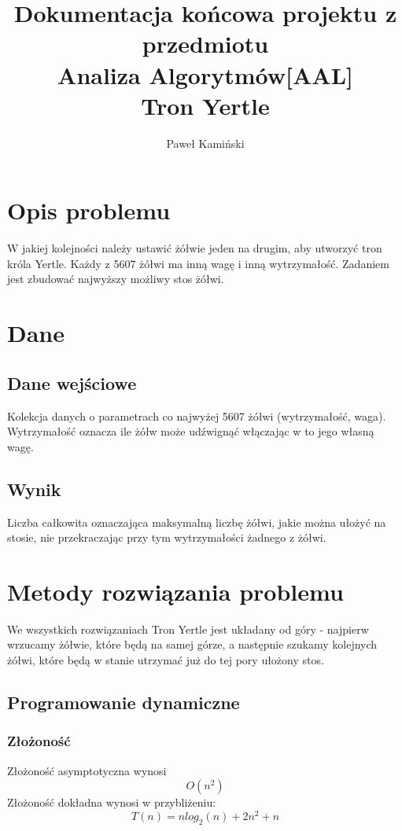 \documentclass[11pt,a4paper]{article}
\title{Dokumentacja końcowa projektu z przedmiotu\\Analiza Algorytmów[AAL]\\Tron Yertle}
\author{Paweł Kamiński}
\begin{document}
\maketitle
\section{Opis problemu}

W jakiej kolejności należy ustawić żółwie jeden na drugim, aby utworzyć tron króla Yertle. Każdy z 5607 żółwi ma inną wagę i inną wytrzymałość. Zadaniem jest zbudować najwyższy możliwy stos żółwi.

\section{Dane}

\subsection{Dane wejściowe} Kolekcja danych o parametrach co najwyżej 5607 żółwi (wytrzymałość, waga). Wytrzymałość oznacza ile żółw może udźwignąć włączając w to jego własną wagę.

\subsection{Wynik}
Liczba całkowita oznaczająca maksymalną liczbę żółwi, jakie można ułożyć na stosie, nie przekraczając przy tym wytrzymałości żadnego z żółwi.

\section{Metody rozwiązania problemu}
We wszystkich rozwiązaniach Tron Yertle jest układany od góry - najpierw wrzucamy żółwie, które będą na samej górze, a następnie szukamy kolejnych żółwi, które będą w stanie utrzymać już do tej pory ułożony stos.
\subsection{Programowanie dynamiczne}
\subsubsection{Złożoność}
Złożoność asymptotyczna wynosi 
\begin{equation}
O(n^2)
\end{equation}
Złożoność dokładna wynosi w przybliżeniu:
\begin{equation}
T(n)=nlog_2(n)+2n^2+n
\end{equation}
\end{document}
